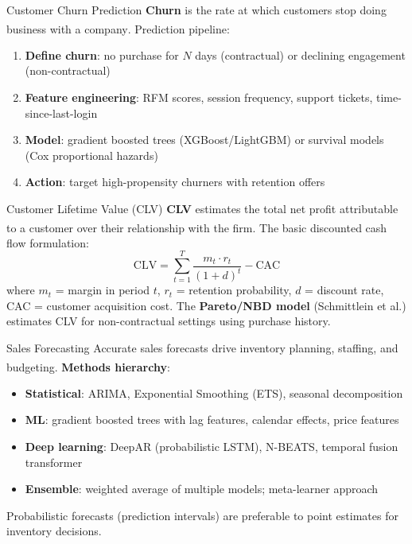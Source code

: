 \begin{v3topic}{Customer Churn Prediction}
    \textbf{Churn} is the rate at which customers stop doing business with a company\textsuperscript{\cite[][pp.~145--150]{chaffeyDigitalBusinessECommerce2019}}.
    Prediction pipeline:
    \begin{enumerate}
        \item \textbf{Define churn}: no purchase for $N$ days (contractual) or declining engagement (non-contractual)
        \item \textbf{Feature engineering}: RFM scores, session frequency, support tickets, time-since-last-login
        \item \textbf{Model}: gradient boosted trees (XGBoost/LightGBM) or survival models (Cox proportional hazards)
        \item \textbf{Action}: target high-propensity churners with retention offers
    \end{enumerate}

\end{v3topic}
\begin{v3topic}{Customer Lifetime Value (CLV)}
    \textbf{CLV} estimates the total net profit attributable to a customer over their relationship with the firm\textsuperscript{\cite[][pp.~152--157]{chaffeyDigitalBusinessECommerce2019}}.
    The basic discounted cash flow formulation:
    \begin{equation}
        \text{CLV} = \sum_{t=1}^{T} \frac{m_t \cdot r_t}{(1+d)^t} - \text{CAC}
    \end{equation}
    where $m_t$ = margin in period $t$, $r_t$ = retention probability, $d$ = discount rate, CAC = customer acquisition cost.
    The \textbf{Pareto/NBD model} (Schmittlein et al.) estimates CLV for non-contractual settings using purchase history.

\end{v3topic}
\begin{v3topic}{Sales Forecasting}
    Accurate sales forecasts drive inventory planning, staffing, and budgeting\textsuperscript{\cite[][pp.~4--8]{hyndmanForecastingPrinciples2021}}.
    \textbf{Methods hierarchy}:
    \begin{itemize}
        \item \textbf{Statistical}: ARIMA, Exponential Smoothing (ETS), seasonal decomposition
        \item \textbf{ML}: gradient boosted trees with lag features, calendar effects, price features
        \item \textbf{Deep learning}: DeepAR (probabilistic LSTM), N-BEATS, temporal fusion transformer
        \item \textbf{Ensemble}: weighted average of multiple models; meta-learner approach
    \end{itemize}
    Probabilistic forecasts (prediction intervals) are preferable to point estimates for inventory decisions.

\end{v3topic}
